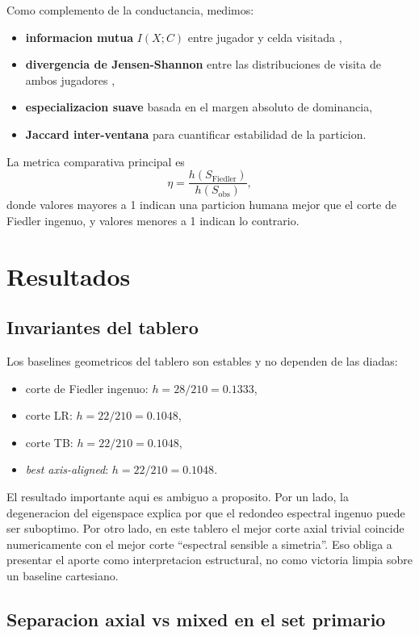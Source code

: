 \documentclass[conference]{IEEEtran}
\newcommand{\Sobs}{S_{\mathrm{obs}}}
\newcommand{\Sfied}{S_{\mathrm{Fiedler}}}
\begin{document}
Como complemento de la conductancia, medimos:
\begin{itemize}
\item \textbf{informacion mutua} $I(X;C)$ entre jugador y celda visitada \cite{cover2006},
\item \textbf{divergencia de Jensen-Shannon} entre las distribuciones de visita de ambos jugadores \cite{lin1991},
\item \textbf{especializacion suave} basada en el margen absoluto de dominancia,
\item \textbf{Jaccard inter-ventana} para cuantificar estabilidad de la particion.
\end{itemize}

La metrica comparativa principal es
\[
\eta = \frac{h(\Sfied)}{h(\Sobs)},
\]
donde valores mayores a 1 indican una particion humana mejor que el corte de Fiedler ingenuo, y valores menores a 1 indican lo contrario.

\section{Resultados}

\subsection{Invariantes del tablero}

Los baselines geometricos del tablero son estables y no dependen de las diadas:
\begin{itemize}
\item corte de Fiedler ingenuo: $h=28/210=0.1333$,
\item corte LR: $h=22/210=0.1048$,
\item corte TB: $h=22/210=0.1048$,
\item \emph{best axis-aligned}: $h=22/210=0.1048$.
\end{itemize}

El resultado importante aqui es ambiguo a proposito. Por un lado, la degeneracion del eigenspace explica por que el redondeo espectral ingenuo puede ser suboptimo. Por otro lado, en este tablero el mejor corte axial trivial coincide numericamente con el mejor corte ``espectral sensible a simetria''. Eso obliga a presentar el aporte como interpretacion estructural, no como victoria limpia sobre un baseline cartesiano.

\subsection{Separacion axial vs mixed en el set primario}
\end{document}
